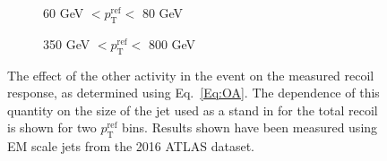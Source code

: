 \begin{figure}[!ht]
  \centering
  \begin{subfigure}{.5\textwidth}
    \centering
    \caption{60 GeV $< p_{\mathrm{T}}^{\mathrm{ref}} < $ 80 GeV}
  \end{subfigure}%
  \begin{subfigure}{.5\textwidth}  \centering
    \caption{350 GeV $< p_{\mathrm{T}}^{\mathrm{ref}} < $ 800 GeV}
  \end{subfigure}
  \caption[$\Delta^{\mathrm{OA}}$ using various cone sizes]
{\small The effect of the other activity in the event on the measured recoil response, as determined using Eq.~\ref{Eq:OA}.  The dependence of this quantity on the size of the jet used as a stand in for the total recoil is shown for two $p_{\mathrm{T}}^{\mathrm {ref}}$ bins.  Results shown have been measured using EM scale jets from the 2016 ATLAS dataset.  }
  \label{Fig:OA_ConeSize}
\end{figure}












